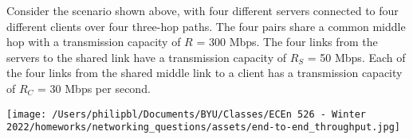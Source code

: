 \documentclass[
  addpoints, answers]{exam}
\begin{document}
\begin{questions}
\newpage


\question[3] Consider the scenario shown above, with four different servers connected to four different clients over four three-hop paths. The four pairs share a common middle hop with a transmission capacity of $R$ = 300 Mbps. The four links from the servers to the shared link have a transmission capacity of $R_S$ = 50 Mbps. Each of the four links from the shared middle link to a client has a transmission capacity of $R_C$ = 30 Mbps per second.
\begin{center}
\texttt{[image: /Users/philipbl/Documents/BYU/Classes/ECEn 526 - Winter 2022/homeworks/networking\_questions/assets/end-to-end\_throughput.jpg]}
\end{center}





\newpage



\end{questions}
\end{document}

